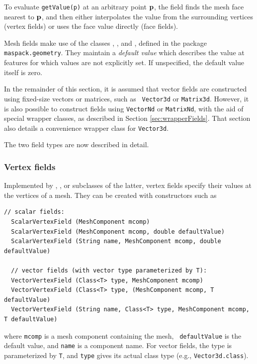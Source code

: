 To evaluate {\tt getValue(p)} at an arbitrary point ${\bf p}$, the field
finds the mesh face nearest to ${\bf p}$, and then either interpolates the
value from the surrounding vertices (vertex fields) or uses the face
value directly (face fields).

Mesh fields make use of the classes
,
, and
, defined in the package
{\tt maspack.geometry}.  They maintain a {\it default value} which
describes the value at features for which values are not explicitly
set. If unspecified, the default value itself is zero.

In the remainder of this section, it is assumed that vector fields are
constructed using fixed-size vectors or matrices, such as {\tt
Vector3d} or {\tt Matrix3d}.  However, it is also possible to
construct fields using {\tt VectorNd} or {\tt MatrixNd}, with the aid
of special wrapper classes, as described in Section
\ref{sec:wrapperFields}. That section also details a convenience
wrapper class for {\tt Vector3d}.

The two field types are now described in detail.

\subsubsection{Vertex fields}

Implemented by
,
, 
or subclasses of the latter, vertex fields specify their values at the
vertices of a mesh. They can be created with constructors such as
%
\begin{lstlisting}[]
  // scalar fields:
  ScalarVertexField (MeshComponent mcomp)
  ScalarVertexField (MeshComponent mcomp, double defaultValue)
  ScalarVertexField (String name, MeshComponent mcomp, double defaultValue)

  // vector fields (with vector type parameterized by T):
  VectorVertexField (Class<T> type, MeshComponent mcomp)
  VectorVertexField (Class<T> type, (MeshComponent mcomp, T defaultValue)
  VectorVertexField (String name, Class<T> type, MeshComponent mcomp, T defaultValue)
\end{lstlisting}
%
where {\tt mcomp} is a mesh component containing the mesh, {\tt
defaultValue} is the default value, and {\tt name} is a component
name. For vector fields, the 
type is parameterized by {\tt T}, and {\tt type} gives its actual
class type (e.g., {\tt Vector3d.class}).

